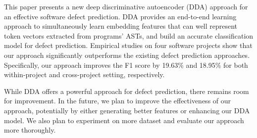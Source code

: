 
This paper presents a new deep discriminative autoencoder (DDA) approach for an effective software defect prediction. DDA provides an end-to-end learning approach to simultaneously learn embedding features that can well represent token vectors extracted from programs' ASTs, and build an accurate classification model for defect prediction. Empirical studies on four software projects show that our approach significantly outperforms the existing defect prediction approaches. Specifically, our approach improves the F1 score by 19.63\% and 18.95\% 
for both within-project and cross-project setting, respectively. 

While DDA offers a powerful approach for defect prediction, there remains room for improvement. In the future, we plan to improve the effectiveness of our approach, potentially by either generating better features or enhancing our DDA model. We also plan to experiment on more dataset and evaluate our approach more thoroughly. 


%


